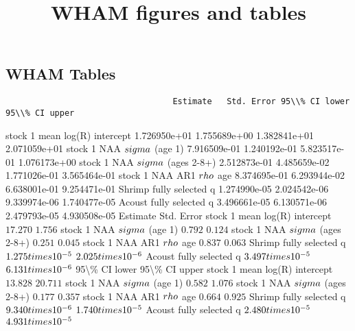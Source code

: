 \documentclass[
]{article}
\title{WHAM figures and tables}
\author{}
\date{\vspace{-2.5em}}
\begin{document}
\maketitle

\subsection{WHAM Tables}\label{wham-tables}

\begin{verbatim}
                                  Estimate   Std. Error 95\\% CI lower 95\\% CI upper
\end{verbatim}

stock 1 mean log(R) intercept 1.726950e+01 1.755689e+00 1.382841e+01
2.071059e+01 stock 1 NAA \(\\sigma\) (age 1) 7.916509e-01 1.240192e-01
5.823517e-01 1.076173e+00 stock 1 NAA \(\\sigma\) (ages 2-8+)
2.512873e-01 4.485659e-02 1.771026e-01 3.565464e-01 stock 1 NAA AR1
\(\\rho\) age 8.374695e-01 6.293944e-02 6.638001e-01 9.254471e-01 Shrimp
fully selected q 1.274990e-05 2.024542e-06 9.339974e-06 1.740477e-05
Acoust fully selected q 3.496661e-05 6.130571e-06 2.479793e-05
4.930508e-05 Estimate Std. Error stock 1 mean log(R) intercept
\(17.270\) \(1.756\) stock 1 NAA \(\\sigma\) (age 1) \(0.792\) \(0.124\)
stock 1 NAA \(\\sigma\) (ages 2-8+) \(0.251\) \(0.045\) stock 1 NAA AR1
\(\\rho\) age \(0.837\) \(0.063\) Shrimp fully selected q
\(1.275\\times 10^{-5}\) \(2.025\\times 10^{-6}\) Acoust fully selected
q \(3.497\\times 10^{-5}\) \(6.131\\times 10^{-6}\) 95\textbackslash\%
CI lower 95\textbackslash\% CI upper stock 1 mean log(R) intercept
\(13.828\) \(20.711\) stock 1 NAA \(\\sigma\) (age 1) \(0.582\)
\(1.076\) stock 1 NAA \(\\sigma\) (ages 2-8+) \(0.177\) \(0.357\) stock
1 NAA AR1 \(\\rho\) age \(0.664\) \(0.925\) Shrimp fully selected q
\(9.340\\times 10^{-6}\) \(1.740\\times 10^{-5}\) Acoust fully selected
q \(2.480\\times 10^{-5}\) \(4.931\\times 10^{-5}\)
\end{document}

